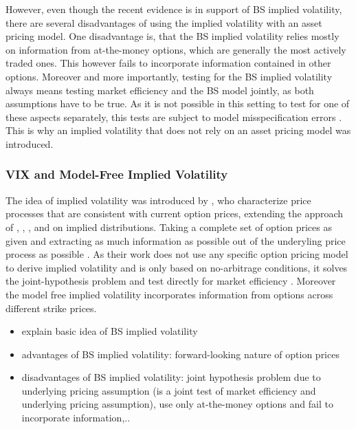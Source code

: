 However, even though the recent evidence is in support of \gls{BS} implied volatility, there are several disadvantages of using the implied volatility with an asset pricing model. One disadvantage is, that the \gls{BS} implied volatility relies mostly on information from at-the-money options, which are generally the most actively traded ones. This however fails to incorporate information contained in other options. Moreover and more importantly, testing for the \gls{BS} implied volatility always means testing market efficiency and the \gls{BS} model jointly, as both assumptions have to be true. As it is not possible in this setting to test for one of these aspects separately, this tests are subject to model misspecification errors \parencite{jiang2005}. This is why an implied volatility that does not rely on an asset pricing model was introduced. 


\subsubsection{VIX and Model-Free Implied Volatility}
The idea of implied volatility was introduced by \textcite{britten2000}, who characterize price processes that are consistent with current option prices, extending the approach of \textcite{derman1994}, \textcite{kani1994}, \textcite{dupire1994}, \textcite{dupire1997} and \textcite{rubinstein1994} on implied distributions. Taking a complete set of option prices as given and extracting as much information as possible out of the underyling price process as possible \parencite{britten2000}. As their work does not use any specific option pricing model to derive implied volatility and is only based on no-arbitrage conditions, it solves the joint-hypothesis problem and test directly for market efficiency \parencite{jiang2005}. Moreover the model free implied volatility incorporates information from options across different strike prices.\\



\begin{itemize}\itemsep0pt
\item explain basic idea of BS implied volatility
\item advantages of BS implied volatility: forward-looking nature of option prices
\item disadvantages of BS implied volatility: joint hypothesis problem due to underlying  pricing assumption (is a joint test of market efficiency and underlying pricing assumption), use only at-the-money options and fail to incorporate information,..
\end{itemize}



